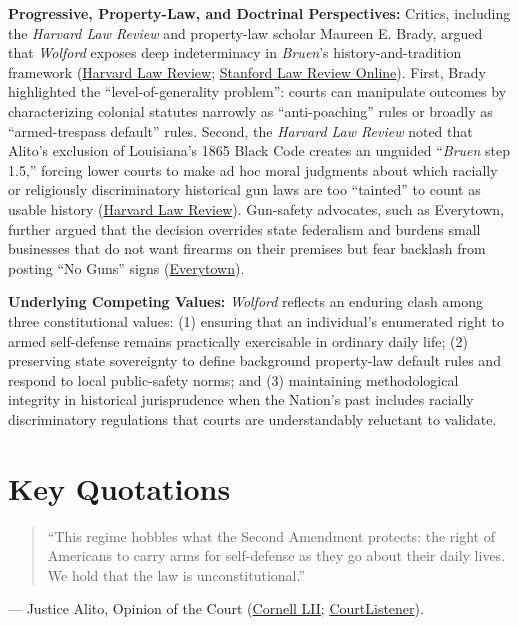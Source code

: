 \documentclass[12pt]{article}
\begin{document}
\textbf{Progressive, Property-Law, and Doctrinal Perspectives:} Critics, including the \textit{Harvard Law Review} and property-law scholar Maureen E. Brady, argued that \textit{Wolford} exposes deep indeterminacy in \textit{Bruen}'s history-and-tradition framework (\href{https://harvardlawreview.org/print/vol-140/wolford-v-lopez/}{Harvard Law Review}; \href{https://review.law.stanford.edu/online/property-v-guns-the-level-of-generality-problem-in-wolford/}{Stanford Law Review Online}). First, Brady highlighted the ``level-of-generality problem'': courts can manipulate outcomes by characterizing colonial statutes narrowly as ``anti-poaching'' rules or broadly as ``armed-trespass default'' rules. Second, the \textit{Harvard Law Review} noted that Alito's exclusion of Louisiana's 1865 Black Code creates an unguided ``\textit{Bruen} step 1.5,'' forcing lower courts to make ad hoc moral judgments about which racially or religiously discriminatory historical gun laws are too ``tainted'' to count as usable history (\href{https://harvardlawreview.org/print/vol-140/wolford-v-lopez/}{Harvard Law Review}). Gun-safety advocates, such as Everytown, further argued that the decision overrides state federalism and burdens small businesses that do not want firearms on their premises but fear backlash from posting ``No Guns'' signs (\href{https://www.everytown.org/wolford-v-lopez-second-amendment-scotus-decision-explained/}{Everytown}).

\textbf{Underlying Competing Values:} \textit{Wolford} reflects an enduring clash among three constitutional values: (1) ensuring that an individual's enumerated right to armed self-defense remains practically exercisable in ordinary daily life; (2) preserving state sovereignty to define background property-law default rules and respond to local public-safety norms; and (3) maintaining methodological integrity in historical jurisprudence when the Nation's past includes racially discriminatory regulations that courts are understandably reluctant to validate.

\section{Key Quotations}

\begin{quote}
``This regime hobbles what the Second Amendment protects: the right of Americans to carry arms for self-defense as they go about their daily lives. We hold that the law is unconstitutional.''
\end{quote}
\noindent --- Justice Alito, Opinion of the Court (\href{https://www.law.cornell.edu/supremecourt/text/24-1046}{Cornell LII}; \href{https://www.courtlistener.com/opinion/10880241/wolford-v-lopez/}{CourtListener}).
\end{document}
